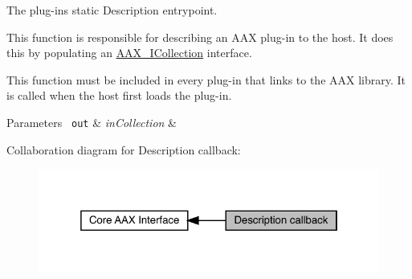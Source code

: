 The plug-\/in\textquotesingle{}s static Description entrypoint. 

This function is responsible for describing an A\+AX plug-\/in to the host. It does this by populating an \mbox{\hyperlink{a01777}{A\+A\+X\+\_\+\+I\+Collection}} interface.

This function must be included in every plug-\/in that links to the A\+AX library. It is called when the host first loads the plug-\/in.


\begin{DoxyParams}[1]{Parameters}
\mbox{\texttt{ out}}  & {\em in\+Collection} & \\
\hline
\end{DoxyParams}
Collaboration diagram for Description callback\+:
\nopagebreak
\begin{figure}[H]
\begin{center}
\leavevmode
\includegraphics[width=323pt]{a00796}
\end{center}
\end{figure}
